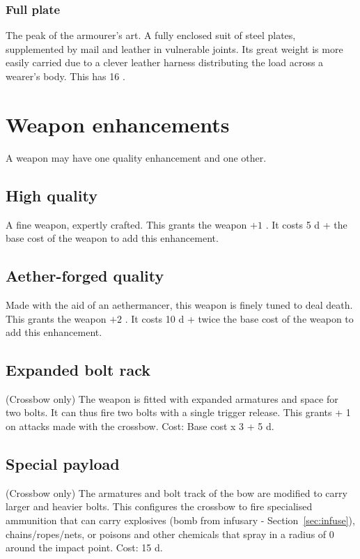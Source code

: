 \documentclass[a4paper,11pt,oneside]{book}
\newcommand{\textlf}[1]{\textbf{\titlecap{#1}}}
\begin{document}
\subsubsection{Full plate}
The peak of the armourer's art. A fully enclosed suit of steel plates, supplemented by mail and leather in vulnerable joints. Its great weight is more easily carried due to a clever leather harness distributing the load across a wearer's body. This has 16 \textlf{toughness}. 



\section{Weapon enhancements}
A weapon may have one quality enhancement and one other. 

\subsection{High quality}
A fine weapon, expertly crafted. This grants the weapon $+1$ \textlf{Power}. It costs 5 d + the base cost of the weapon to add this enhancement.

\subsection{Aether-forged quality}
Made with the aid of an aethermancer, this weapon is finely tuned to deal death. This grants the weapon $+2$ \textlf{Power}. It costs 10 d + twice the base cost of the weapon to add this enhancement.

\subsection{Expanded bolt rack}
(Crossbow only) The weapon is fitted with expanded armatures and space for two bolts. It can thus fire two bolts with a single trigger release. This grants \textlf{Burst} + 1 on attacks made with the crossbow. Cost: Base cost x 3 + 5 d. 

\subsection{Special payload}
(Crossbow only) The armatures and bolt track of the bow are modified to carry larger and heavier bolts. This configures the crossbow to fire specialised ammunition that can carry explosives (bomb from infusary - Section~\ref{sec:infuse}), chains/ropes/nets, or poisons and other chemicals that spray in a radius of 0 around the impact point. Cost: 15 d.
\end{document}
